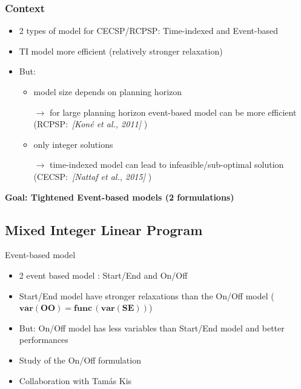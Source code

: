 
\begin{frame}
  \frametitle{Context}
  \begin{itemize}
  \item 2 types of model for CECSP/RCPSP: Time-indexed and Event-based
    \vfill
  \item TI model more efficient {\small (relatively stronger relaxation)}
    \pause
    \vfill
  \item But:
    \begin{itemize}
    \item  model size depends on planning horizon 
      
    {\footnotesize  $\longrightarrow $ for large planning horizon event-based model can be more
      efficient (RCPSP:~{\color{gray!50!black!70}\it [Koné et al.,
        2011]} )}
      \vfill
      \pause
    \item only integer solutions
      
      {\footnotesize $\longrightarrow$ time-indexed model can lead to
      infeasible/sub-optimal solution
      (CECSP:~{\color{gray!50!black!70}\it [Nattaf et al., 2015]} )}
    \end{itemize}
  \end{itemize}
  \vfill
  \pause
  {\bf Goal: Tightened Event-based models (2 formulations)} 
\end{frame}

\subsection{Mixed Integer Linear Program}
\begin{frame}{Event-based model}
  \vfill
  \begin{itemize}
  \item 2 event based model : Start/End and On/Off
    \vfill
    \pause
  \item Start/End model have stronger relaxations than the On/Off
    model ( $\mathbf{var(OO) = func\, (var (SE))}$)
    \pause
    \vfill
  \item But: On/Off model has less variables than Start/End model
    \pause
    and  better performances  
    \vfill
    \pause
  \item Study of the On/Off formulation
    \vfill
    \pause
  \item Collaboration with Tam{\'a}s Kis 
  \end{itemize} 
  \vfill
\end{frame}

